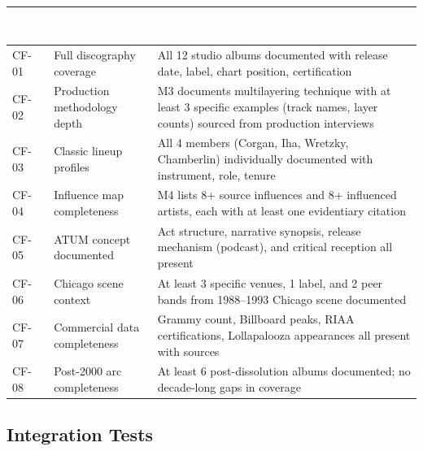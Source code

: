 \documentclass[11pt,letterpaper]{article}
\newcommand{\tableheader}[1]{\textbf{\sffamily\textcolor{white}{#1}}}
\begin{document}
\begin{center}
\begin{tabularx}{\textwidth}{C{1.5cm}L{4cm}X}
\toprule
{}
\tableheader{Test ID} & \tableheader{Verifies} & \tableheader{Expected} \\
\midrule
CF-01 & Full discography coverage & All 12 studio albums documented with release date, label, chart position, certification \\
CF-02 & Production methodology depth & M3 documents multilayering technique with at least 3 specific examples (track names, layer counts) sourced from production interviews \\
CF-03 & Classic lineup profiles & All 4 members (Corgan, Iha, Wretzky, Chamberlin) individually documented with instrument, role, tenure \\
CF-04 & Influence map completeness & M4 lists 8+ source influences and 8+ influenced artists, each with at least one evidentiary citation \\
CF-05 & ATUM concept documented & Act structure, narrative synopsis, release mechanism (podcast), and critical reception all present \\
CF-06 & Chicago scene context & At least 3 specific venues, 1 label, and 2 peer bands from 1988--1993 Chicago scene documented \\
CF-07 & Commercial data completeness & Grammy count, Billboard peaks, RIAA certifications, Lollapalooza appearances all present with sources \\
CF-08 & Post-2000 arc completeness & At least 6 post-dissolution albums documented; no decade-long gaps in coverage \\
\bottomrule
\end{tabularx}
\end{center}

\subsection{Integration Tests}
\end{document}
